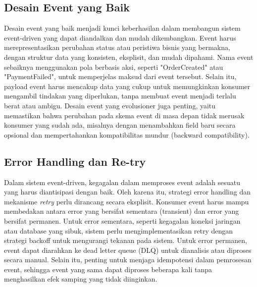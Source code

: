 \subsection{Desain Event yang Baik}
Desain event yang baik menjadi kunci keberhasilan dalam membangun sistem event-driven yang dapat diandalkan dan mudah dikembangkan. Event harus merepresentasikan perubahan status atau peristiwa bisnis yang bermakna, dengan struktur data yang konsisten, eksplisit, dan mudah dipahami. Nama event sebaiknya menggunakan pola berbasis aksi, seperti "OrderCreated" atau "PaymentFailed", untuk memperjelas maksud dari event tersebut. Selain itu, payload event harus mencakup data yang cukup untuk memungkinkan konsumer mengambil tindakan yang diperlukan, tanpa membuat event menjadi terlalu berat atau ambigu. Desain event yang evolusioner juga penting, yaitu memastikan bahwa perubahan pada skema event di masa depan tidak merusak konsumer yang sudah ada, misalnya dengan menambahkan field baru secara opsional dan mempertahankan kompatibilitas mundur (backward compatibility).

\subsection{Error Handling dan Re-try}
Dalam sistem event-driven, kegagalan dalam memproses event adalah sesuatu yang harus diantisipasi dengan baik. Oleh karena itu, strategi error handling dan mekanisme \textit{retry} perlu dirancang secara eksplisit. Konsumer event harus mampu membedakan antara error yang bersifat sementara (transient) dan error yang bersifat permanen. Untuk error sementara, seperti kegagalan koneksi jaringan atau database yang sibuk, sistem perlu mengimplementasikan retry dengan strategi backoff untuk mengurangi tekanan pada sistem. Untuk error permanen, event dapat diarahkan ke dead letter queue (DLQ) untuk dianalisis atau diproses secara manual. Selain itu, penting untuk menjaga idempotensi dalam pemrosesan event, sehingga event yang sama dapat diproses beberapa kali tanpa menghasilkan efek samping yang tidak diinginkan.

